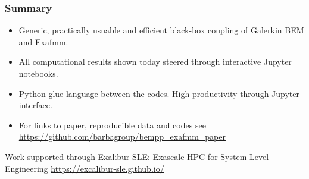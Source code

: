 \documentclass[dvipsnames,10pt]{beamer}
\begin{document}
\begin{frame}
    \frametitle{Summary}

    \begin{itemize}
        \item Generic, practically usuable and efficient black-box coupling of Galerkin
            BEM and Exafmm.
        \item All computational results shown today steered through interactive Jupyter
            notebooks.
        \item Python glue language between the codes. High productivity through Jupyter
            interface.
        \item For links to paper, reproducible data and codes see\\
            \url{https://github.com/barbagroup/bempp_exafmm_paper}
    \end{itemize}

    \vspace{1cm}

    \begin{tcolorbox}
        Work supported through Exalibur-SLE: Exascale HPC for System Level Engineering 
    \url{https://excalibur-sle.github.io/}
    \end{tcolorbox}

\end{frame}
\end{document}
